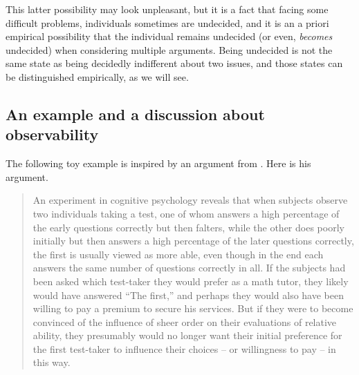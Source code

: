 \documentclass[version=last, pagesize, twoside=off, bibliography=totoc, DIV=calc, fontsize=12pt, a4paper, french, english]{scrartcl}
\begin{document}
This latter possibility may look unpleasant, but it is a fact that facing some difficult problems, individuals sometimes are undecided, and it is an a priori empirical possibility that the individual remains undecided (or even, \emph{becomes} undecided) when considering multiple arguments. 
Being undecided is not the same state as being decidedly indifferent about two issues, and those states can be distinguished empirically, as we will see.

\subsection{An example and a discussion about observability}
The following toy example is inspired by an argument from \citet[p.~59]{railton_facts_2003}. Here is his argument.
\begin{quote}
An experiment in cognitive psychology reveals that when subjects observe two individuals taking a test, one of whom answers a high percentage of the early questions correctly but then falters, while the other does
poorly initially but then answers a high percentage of the later questions
correctly, the first is usually viewed as more able, even though in the end
each answers the same number of questions correctly in all. If the subjects had been asked which test-taker they would prefer as a math tutor,
they likely would have answered “The first,” and perhaps they would also
have been willing to pay a premium to secure his services. But if they
were to become convinced of the influence of sheer order on their evaluations of relative ability, they presumably would no longer want their
initial preference for the first test-taker to influence their choices – or
willingness to pay – in this way.
\end{quote}
\end{document}

